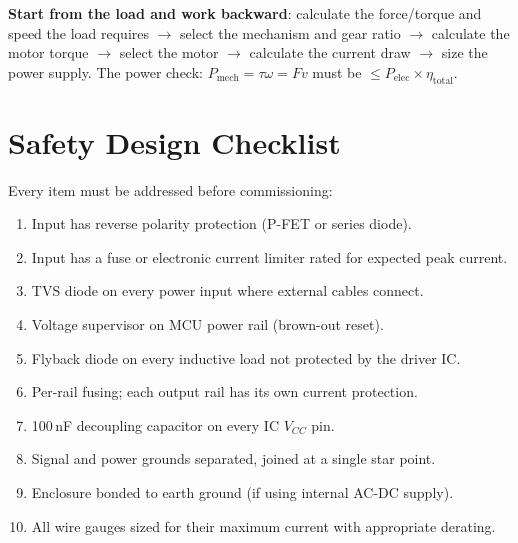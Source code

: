 \begin{keyconceptbox}
\textbf{Start from the load and work backward}: calculate the force/torque and speed the load requires $\to$ select the mechanism and gear ratio $\to$ calculate the motor torque $\to$ select the motor $\to$ calculate the current draw $\to$ size the power supply. The power check: $P_{\text{mech}} = \tau \omega = F v$ must be $\leq P_{\text{elec}} \times \eta_{\text{total}}$.
\end{keyconceptbox}


\section{Safety Design Checklist}
\label{sec:checklist}

Every item must be addressed before commissioning:

\begin{enumerate}[leftmargin=1.5em]
  \item Input has reverse polarity protection (P-FET or series diode).
  \item Input has a fuse or electronic current limiter rated for expected peak current.
  \item TVS diode on every power input where external cables connect.
  \item Voltage supervisor on MCU power rail (brown-out reset).
  \item Flyback diode on every inductive load not protected by the driver IC.
  \item Per-rail fusing; each output rail has its own current protection.
  \item 100\,nF decoupling capacitor on every IC $V_{CC}$ pin.
  \item Signal and power grounds separated, joined at a single star point.
  \item Enclosure bonded to earth ground (if using internal AC-DC supply).
  \item All wire gauges sized for their maximum current with appropriate derating.
\end{enumerate}

